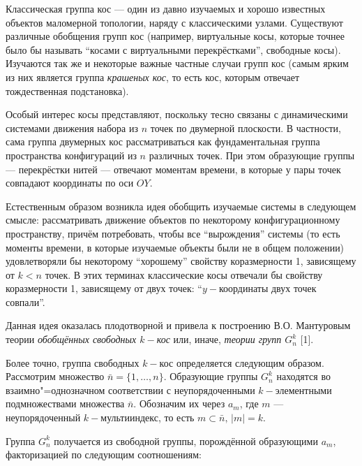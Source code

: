 \vzmscaption

Классическая группа кос --- один из давно изучаемых и хорошо известных объектов маломерной топологии, наряду с классическими узлами. Существуют различные обобщения групп кос (например, виртуальные косы, которые точнее было бы называть ``косами с виртуальными перекрёстками'', свободные косы). Изучаются так же и некоторые важные частные случаи групп кос (самым ярким из них является группа {\em крашеных кос}, то есть кос, которым отвечает тождественная подстановка).

Особый интерес косы представляют, поскольку тесно связаны с динамическими системами движения набора из $n$ точек по двумерной плоскости. В частности, сама группа двумерных кос рассматриваться как фундаментальная группа пространства конфигураций из $n$ различных точек. При этом образующие группы --- перекрёстки нитей --- отвечают моментам времени, в которые у пары точек совпадают координаты по оси $OY$.

Естественным образом возникла идея обобщить изучаемые системы в следующем смысле: рассматривать движение объектов по некоторому конфигурационному пространству, причём потребовать, чтобы все ``вырождения'' системы (то есть моменты времени, в которые изучаемые объекты были не в общем положении) удовлетворяли бы некоторому ``хорошему'' свойству коразмерности 1, зависящему от $k<n$ точек. В этих терминах классические косы отвечали бы свойству коразмерности 1, зависящему от двух точек: ``$y-$координаты двух точек совпали''.

Данная идея оказалась плодотворной и привела к построению В.О. Мантуровым теории {\em обобщённых свободных $k-$кос} или, иначе, {\em теории групп $G_n^k$} [1].

Более точно, группа свободных $k-$кос определяется следующим образом. Рассмотрим множество $\bar{n}=\{1,\dots, n\}$. Образующие группы $G_n^k$ находятся во взаимно"=однозначном соответствии с неупорядоченными $k-$элементными подмножествами множества $\bar{n}$. Обозначим их через $a_m$, где $m$ --- неупорядоченный $k-$мультииндекс, то есть $m\subset \bar{n}, \, |m|=k$.

Группа $G_n^k$ получается из свободной группы, порождённой образующими $a_m$, факторизацией по следующим соотношениям:

